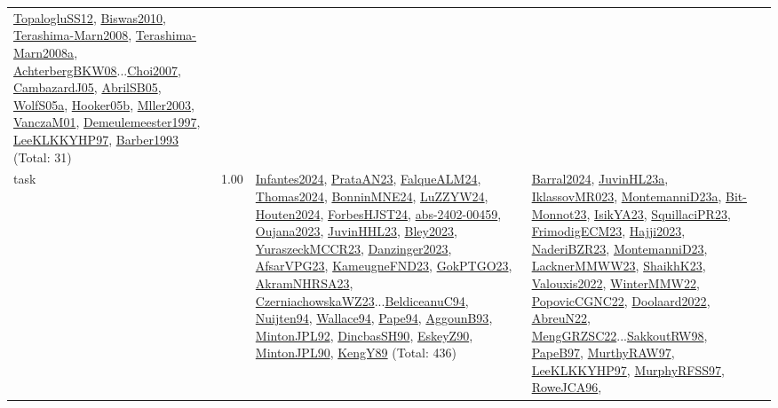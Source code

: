 {\begin{longtable}{p{3cm}r>{\raggedright\arraybackslash}p{6cm}>{\raggedright\arraybackslash}p{6cm}>{\raggedright\arraybackslash}p{8cm}}
\hyperref[detail:TopalogluSS12]{TopalogluSS12}, \hyperref[detail:Biswas2010]{Biswas2010}, \hyperref[detail:Terashima-Marn2008]{Terashima-Marn2008}, \hyperref[detail:Terashima-Marn2008a]{Terashima-Marn2008a}, \hyperref[detail:AchterbergBKW08]{AchterbergBKW08}...\hyperref[detail:Choi2007]{Choi2007}, \hyperref[detail:CambazardJ05]{CambazardJ05}, \hyperref[detail:AbrilSB05]{AbrilSB05}, \hyperref[detail:WolfS05a]{WolfS05a}, \hyperref[detail:Hooker05b]{Hooker05b}, \hyperref[detail:Mller2003]{Mller2003}, \hyperref[detail:VanczaM01]{VanczaM01}, \hyperref[detail:Demeulemeester1997]{Demeulemeester1997}, \hyperref[detail:LeeKLKKYHP97]{LeeKLKKYHP97}, \hyperref[detail:Barber1993]{Barber1993} (Total: 31)\\
\index{task}\index{Scheduling!task}task &  1.00 & \hyperref[detail:Infantes2024]{Infantes2024}, \hyperref[detail:PrataAN23]{PrataAN23}, \hyperref[detail:FalqueALM24]{FalqueALM24}, \hyperref[detail:Thomas2024]{Thomas2024}, \hyperref[detail:BonninMNE24]{BonninMNE24}, \hyperref[detail:LuZZYW24]{LuZZYW24}, \hyperref[detail:Houten2024]{Houten2024}, \hyperref[detail:ForbesHJST24]{ForbesHJST24}, \hyperref[detail:abs-2402-00459]{abs-2402-00459}, \hyperref[detail:Oujana2023]{Oujana2023}, \hyperref[detail:JuvinHHL23]{JuvinHHL23}, \hyperref[detail:Bley2023]{Bley2023}, \hyperref[detail:YuraszeckMCCR23]{YuraszeckMCCR23}, \hyperref[detail:Danzinger2023]{Danzinger2023}, \hyperref[detail:AfsarVPG23]{AfsarVPG23}, \hyperref[detail:KameugneFND23]{KameugneFND23}, \hyperref[detail:GokPTGO23]{GokPTGO23}, \hyperref[detail:AkramNHRSA23]{AkramNHRSA23}, \hyperref[detail:CzerniachowskaWZ23]{CzerniachowskaWZ23}...\hyperref[detail:BeldiceanuC94]{BeldiceanuC94}, \hyperref[detail:Nuijten94]{Nuijten94}, \hyperref[detail:Wallace94]{Wallace94}, \hyperref[detail:Pape94]{Pape94}, \hyperref[detail:AggounB93]{AggounB93}, \hyperref[detail:MintonJPL92]{MintonJPL92}, \hyperref[detail:DincbasSH90]{DincbasSH90}, \hyperref[detail:EskeyZ90]{EskeyZ90}, \hyperref[detail:MintonJPL90]{MintonJPL90}, \hyperref[detail:KengY89]{KengY89} (Total: 436) & \hyperref[detail:Barral2024]{Barral2024}, \hyperref[detail:JuvinHL23a]{JuvinHL23a}, \hyperref[detail:IklassovMR023]{IklassovMR023}, \hyperref[detail:MontemanniD23a]{MontemanniD23a}, \hyperref[detail:Bit-Monnot23]{Bit-Monnot23}, \hyperref[detail:IsikYA23]{IsikYA23}, \hyperref[detail:SquillaciPR23]{SquillaciPR23}, \hyperref[detail:FrimodigECM23]{FrimodigECM23}, \hyperref[detail:Hajji2023]{Hajji2023}, \hyperref[detail:NaderiBZR23]{NaderiBZR23}, \hyperref[detail:MontemanniD23]{MontemanniD23}, \hyperref[detail:LacknerMMWW23]{LacknerMMWW23}, \hyperref[detail:ShaikhK23]{ShaikhK23}, \hyperref[detail:Valouxis2022]{Valouxis2022}, \hyperref[detail:WinterMMW22]{WinterMMW22}, \hyperref[detail:PopovicCGNC22]{PopovicCGNC22}, \hyperref[detail:Doolaard2022]{Doolaard2022}, \hyperref[detail:AbreuN22]{AbreuN22}, \hyperref[detail:MengGRZSC22]{MengGRZSC22}...\hyperref[detail:SakkoutRW98]{SakkoutRW98}, \hyperref[detail:PapeB97]{PapeB97}, \hyperref[detail:MurthyRAW97]{MurthyRAW97}, \hyperref[detail:LeeKLKKYHP97]{LeeKLKKYHP97}, \hyperref[detail:MurphyRFSS97]{MurphyRFSS97}, \hyperref[detail:RoweJCA96]{RoweJCA96}, 
\end{longtable}}
